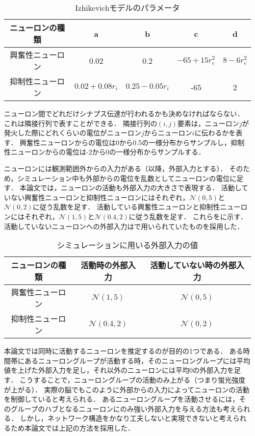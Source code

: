 \begin{table}[htb]
  \center
  \begin{tabular}{|c|cccc|} \hline
    ニューロンの種類 & a & b & c & d \\ \hline
    興奮性ニューロン & 0.02 & 0.2 & $-65 + 15 r_e^2$ & $8 - 6r_e^2$ \\
    抑制性ニューロン & $0.02 + 0.08r_i$ & $0.25 - 0.05 r_i$ & -65 & 2 \\ \hline
  \end{tabular}
  \caption{Izhikevichモデルのパラメータ}
  \label{tab:parameter1}
\end{table}

ニューロン間でどれだけシナプス伝達が行われるかも決めなければならない．
これは隣接行列で表すことができる．
隣接行列の$(i,j)$要素は，ニューロン$j$が発火した際にどれくらいの電位がニューロン$j$からニューロン$i$に伝わるかを表す．
興奮性ニューロンからの電位は0から0.5の一様分布からサンプルし，抑制性ニューロンからの電位は-2から0の一様分布からサンプルする．

ニューロンには観測範囲外からの入力がある（以降，外部入力とする）．
そのため，シミュレーション中も外部からの電位を乱数としてニューロンの電位に足す．
本論文では，ニューロンの活動も外部入力の大きさで表現する．
活動していない興奮性ニューロンと抑制性ニューロンにはそれぞれ，$\mathcal{N}(0,5)$と$\mathcal{N}(0,2)$に従う乱数を足す．
活動している興奮性ニューロンと抑制性ニューロンにはそれぞれ，$\mathcal{N}(1,5)$と$\mathcal{N}(0.4,2)$に従う乱数を足す．
これらをに示す．
活動していないニューロンへの外部入力は\cite{Izhikevich2003}で用いられていたものを採用した．

\begin{table}[htb]
  \center
  \begin{tabular}{|c|cc|} \hline
    ニューロンの種類 & 活動時の外部入力 & 活動していない時の外部入力 \\ \hline
		興奮性ニューロン & $\mathcal{N}(1,5)$ & $\mathcal{N}(0, 5)$ \\
		抑制性ニューロン & $\mathcal{N}(0.4, 2)$ & $\mathcal{N}(0, 2)$ \\ \hline
  \end{tabular}
  \caption{シミュレーションに用いる外部入力の値}
  \label{tab:parameter3}
\end{table}

本論文では同時に活動するニューロンを推定するのが目的の1つである．
ある時間帯にあるニューロングループが活動する時，そのニューロングループには平均値を上げた外部入力を足し，それ以外のニューロンには平均$0$の外部入力を足す．
こうすることで，ニューロングループの活動のみ上がる（つまり蛍光強度が上がる）．
実際の脳でもこのように外部からの入力によってニューロンの活動を制御していると考えられる．
あるニューロングループを活動させるには，そのグループのハブとなるニューロンにのみ強い外部入力を与える方法も考えられる．
しかし，ネットワーク構造をかなり工夫しないと実現できないと考えられるため本論文では上記の方法を採用した．

